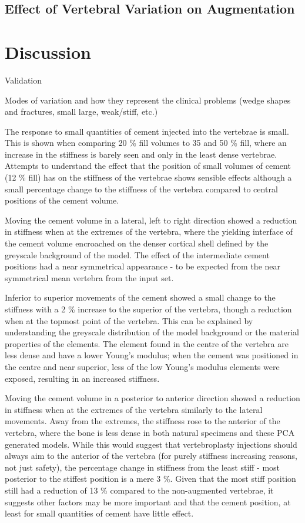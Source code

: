 \subsection{Effect of Vertebral Variation on Augmentation}

\section{Discussion}
\label{pca_disc}

Validation

Modes of variation and how they represent the clinical problems (wedge shapes and fractures, small large, weak/stiff, etc.)

	
The response to small quantities of cement injected into the vertebrae is small. This is shown when comparing 20 \% fill volumes to 35 and 50 \% fill, where an increase in the stiffness is barely seen and only in the least dense vertebrae.
Attempts to understand the effect that the position of small volumes of cement (12 \% fill) has on the stiffness of the vertebrae shows sensible effects although a small percentage change to the stiffness of the vertebra compared to central positions of the cement volume.



Moving the cement volume in a lateral, left to right direction showed a reduction in stiffness when at the extremes of the vertebra, where the yielding interface of the cement volume encroached on the denser cortical shell defined by the greyscale background of the model.
The effect of the intermediate cement positions had a near symmetrical appearance - to be expected from the near symmetrical mean vertebra from the input set.

Inferior to superior movements of the cement showed a small change to the stiffness with a 2 \% increase to the superior of the vertebra, though a reduction when at the topmost point of the vertebra.
This can be explained by understanding the greyscale distribution of the model background or the material properties of the elements.
The element found in the centre of the vertebra are less dense and have a lower Young's modulus; when the cement was positioned in the centre and near superior, less of the low Young's modulus elements were exposed, resulting in an increased stiffness.

Moving the cement volume in a posterior to anterior direction showed a reduction in stiffness when at the extremes of the vertebra similarly to the lateral movements.
Away from the extremes, the stiffness rose to the anterior of the vertebra, where the bone is less dense in both natural specimens and these PCA generated models.
While this would suggest that vertebroplasty injections should always aim to the anterior of the vertebra (for purely stiffness increasing reasons, not just safety), the percentage change in stiffness from the least stiff - most posterior to the stiffest position is a mere 3 \%.
Given that the most stiff position still had a reduction of 13 \% compared to the non-augmented vertebrae, it suggests other factors may be more important and that the cement position, at least for small quantities of cement have little effect.

